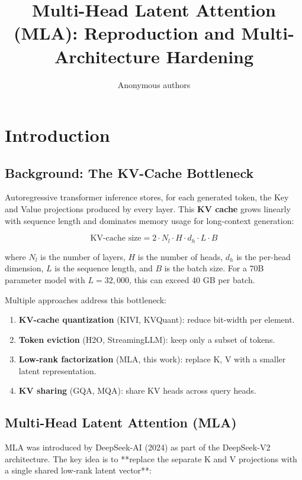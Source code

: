 \title{\textbf{Multi-Head Latent Attention (MLA): Reproduction and Multi-Architecture Hardening}}

\author{Anonymous authors}



\section{Introduction}

\subsection{Background: The KV-Cache Bottleneck}

Autoregressive transformer inference stores, for each generated token, the 
Key and Value projections produced by every layer. This \textbf{KV cache} grows 
linearly with sequence length and dominates memory usage for long-context 
generation:

\[
\text{KV-cache size} = 2 \cdot N_l \cdot H \cdot d_h \cdot L \cdot B
\tag{1.1}
\]

where $N_l$ is the number of layers, $H$ is the number of heads, $d_h$ is the 
per-head dimension, $L$ is the sequence length, and $B$ is the batch size. 
For a 70B parameter model with $L = 32{,}000$, this can exceed 40 GB per 
batch.

Multiple approaches address this bottleneck:

\begin{enumerate}
\item \textbf{KV-cache quantization} (KIVI, KVQuant): reduce bit-width per element.
\item \textbf{Token eviction} (H2O, StreamingLLM): keep only a subset of tokens.
\item \textbf{Low-rank factorization} (MLA, this work): replace K, V with a
  smaller latent representation.
\item \textbf{KV sharing} (GQA, MQA): share KV heads across query heads.

\end{enumerate}
\subsection{Multi-Head Latent Attention (MLA)}

MLA was introduced by DeepSeek-AI (2024) as part of the DeepSeek-V2 
architecture. The key idea is to **replace the separate K and V projections 
with a single shared low-rank latent vector**:

